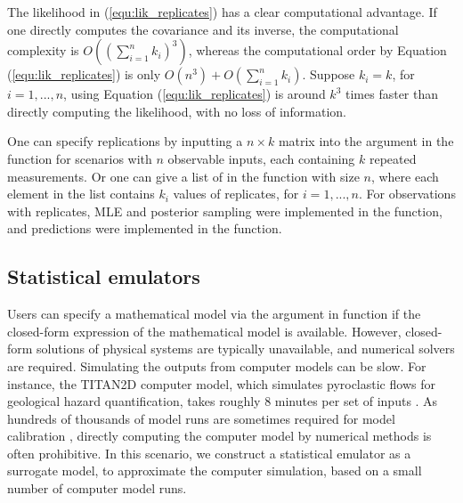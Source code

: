 The likelihood in (\ref{equ:lik_replicates})  has a clear computational advantage. If one directly computes the covariance and its inverse, the computational complexity is $O( (\sum^{n}_{i=1}k_i)^3 )$, whereas the computational order by Equation (\ref{equ:lik_replicates}) is only $O(n^3)+O(\sum^{n}_{i=1}k_i)$. Suppose $k_i=k$, for $i=1,...,n$, using Equation (\ref{equ:lik_replicates}) is around $k^3$ times faster than directly computing the likelihood, with no loss of information.     



 One can specify replications by inputting a $n\times k$ matrix into the argument  in the  function for scenarios with $n$ observable inputs, each containing $k$ repeated measurements. Or one can give a list of  in the  function with size $n$, where each element in the list contains $k_i$ values of replicates, for $i=1,...,n$. For observations with replicates,  MLE and posterior sampling were implemented in the  function, and predictions were implemented in the  function. 



\subsection{Statistical emulators}
Users can specify a mathematical model via the   argument in  function if the closed-form expression of the mathematical model is available. However, closed-form solutions of physical systems are typically unavailable, and numerical solvers are required. Simulating the outputs from computer models can be slow. For instance, the TITAN2D computer model, which simulates pyroclastic flows for geological hazard quantification, takes roughly 8 minutes per set of inputs  \citep{simakov2019modernizing}. As hundreds of thousands of model runs are sometimes required for model calibration \citep{anderson2019magma}, directly computing the computer model by numerical methods is often prohibitive. 
In this scenario, we construct a statistical emulator as a surrogate model, to approximate the computer simulation, based on a small number of computer model runs. 

